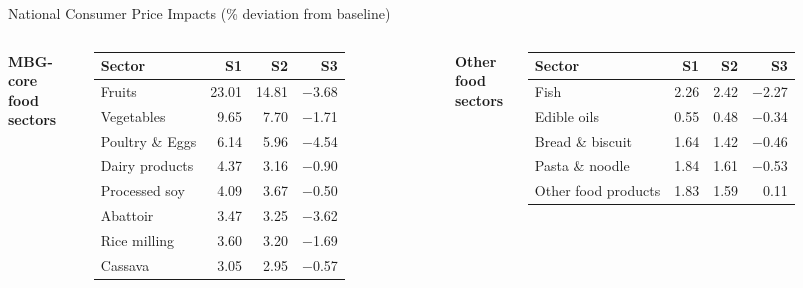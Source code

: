 \documentclass[11pt,aspectratio=169]{beamer}
\begin{document}
\begin{frame}{National Consumer Price Impacts (\% deviation from baseline)}
\scriptsize
\begin{columns}[T,onlytextwidth]
	\centering\textbf{MBG-core food sectors}\\[3pt]
	\begin{tabular}{lrrr}
		\toprule
		\textbf{Sector} & \textbf{S1} & \textbf{S2} & \textbf{S3} \\
		\midrule
		Fruits              &  23.01 &  14.81 & $-$3.68 \\
		Vegetables          &   9.65 &   7.70 & $-$1.71 \\
		\rowcolor{lubrown10} Poultry \& Eggs     &   6.14 &   5.96 & $-$4.54 \\
		Dairy products      &   4.37 &   3.16 & $-$0.90 \\
		Processed soy       &   4.09 &   3.67 & $-$0.50 \\
		Abattoir            &   3.47 &   3.25 & $-$3.62 \\
		Rice milling        &   3.60 &   3.20 & $-$1.69 \\
		Cassava             &   3.05 &   2.95 & $-$0.57 \\
		\bottomrule
	\end{tabular}
	\centering\textbf{Other food sectors}\\[3pt]
	\begin{tabular}{lrrr}
		\toprule
		\textbf{Sector} & \textbf{S1} & \textbf{S2} & \textbf{S3} \\
		\midrule
		Fish                &   2.26 &   2.42 & $-$2.27 \\
		Edible oils         &   0.55 &   0.48 & $-$0.34 \\
		Bread \& biscuit    &   1.64 &   1.42 & $-$0.46 \\
		Pasta \& noodle     &   1.84 &   1.61 & $-$0.53 \\
		Other food products &   1.83 &   1.59 &   0.11 \\
		\bottomrule
	\end{tabular}
	\vspace{8pt}


\end{columns}
\end{frame}
\end{document}
